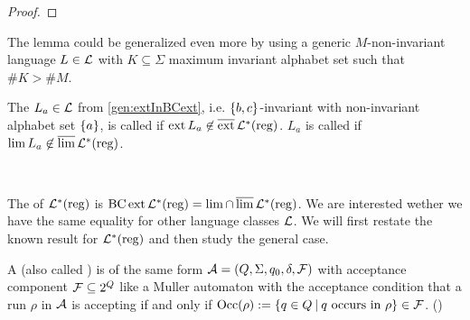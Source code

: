 \begin{theorem}
\begin{proof}
%
\end{proof}
\end{theorem}

The lemma could be generalized even more by using a generic $M$-non-invariant language $L \in \mathcal{L}$ with $K \subseteq \Sigma$ maximum invariant alphabet set such that $\#K > \#M$.

\begin{mydef}
The $L_a \in \mathcal{L}$ from \cref{gen:extInBCext}, i.e. $\Set{b,c}$-invariant with non-invariant alphabet set $\Set{a}$, is called  if $\operatorname{ext} L_a \not\in \operatorname{\overline{ext}} \mathcal{L}^*(\textup{\textrm{reg}})$. $L_a$ is called  if $\lim L_a \not\in \operatorname{\overline{lim}} \mathcal{L}^*(\textup{\textrm{reg}})$.
\end{mydef}

\

The  of $\mathcal{L}^*(\textup{\textrm{reg}})$ is $\operatorname{BC} \operatorname{ext} \mathcal{L}^*(\textup{\textrm{reg}}) = \lim \cap \operatorname{\overline{lim}} \mathcal{L}^*(\textup{\textrm{reg}})$. We are interested wether we have the same equality for other language classes $\mathcal{L}$. We will first restate the known result for $\mathcal{L}^*(\textup{\textrm{reg}})$ and then study the general case.

\begin{mydef}
\label{def:staiger-wagner}
A  (also called ) is of the same form $\mathcal{A} = (Q,\Sigma,q_0,\delta,\mathcal{F})$ with acceptance component $\mathcal{F} \subseteq 2^Q$ like a Muller automaton with the acceptance condition that a run $\rho$ in $\mathcal{A}$ is accepting if and only if $\Occ(\rho) := \Set{q \in Q}{\text{$q$ occurs in $\rho$}} \in \F$.  (\cite[Def.61, p.43]{InfCompR101})
\end{mydef}

